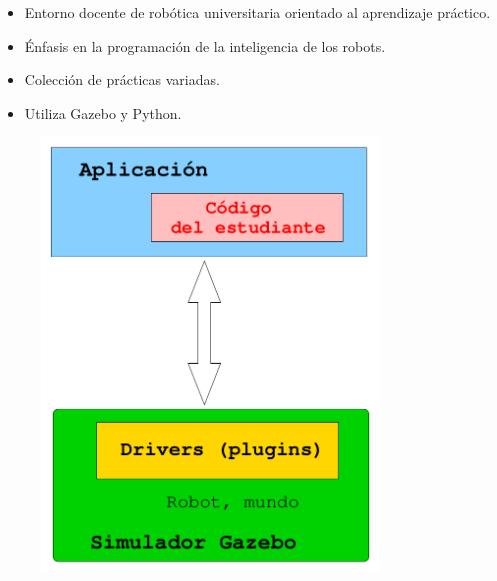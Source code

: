 \documentclass[notes,slidesec,a4]{seminar}
\begin{document}
\begin{hslide}
	\begin{minipage}[t]{0.6\textwidth}
		\begin{itemize}
			\item Entorno docente de robótica universitaria orientado al aprendizaje práctico.
			\item Énfasis en la programación de la inteligencia de los robots. 
			\item Colección de prácticas variadas.
			\item Utiliza Gazebo y Python.
		\end{itemize}
	\end{minipage}
	\begin{minipage}[t]{0.4\textwidth}
		\begin{center}
			\begin{figure}
				\includegraphics[width=0.8\textwidth]{esquemapracticas02.png}
			\end{figure}
		\end{center}
	\end{minipage}
\end{hslide}
\end{document}
